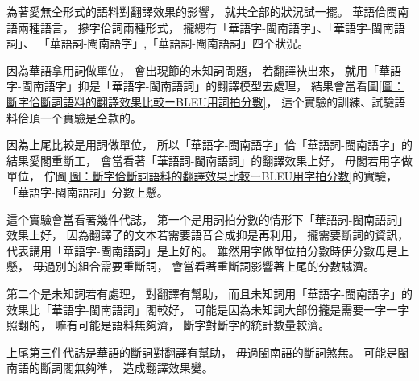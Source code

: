 為著愛無仝形式的語料對翻譯效果的影響，
就共全部的狀況試一擺。
華語佮閩南語兩種語言，
摻字佮詞兩種形式，
攏總有「華語字-閩南語字」、「華語字-閩南語詞」、
「華語詞-閩南語字」,「華語詞-閩南語詞」四个狀況。

因為華語拿用詞做單位，
會出現節的未知詞問題，
若翻譯袂出來，
就用「華語字-閩南語字」抑是「華語字-閩南語詞」的翻譯模型去處理，
結果會當看圖\ref{圖：斷字佮斷詞語料的翻譯效果比較ーBLEU用詞拍分數}，
這个實驗的訓練、試驗語料佮頂一个實驗是仝款的。

因為上尾比較是用詞做單位，
所以「華語字-閩南語字」佮「華語詞-閩南語字」的結果愛閣重斷工，
會當看著「華語詞-閩南語詞」的翻譯效果上好，
毋閣若用字做單位，
佇圖\ref{圖：斷字佮斷詞語料的翻譯效果比較ーBLEU用字拍分數}的實驗，
「華語字-閩南語詞」分數上懸。

這个實驗會當看著幾件代誌，
第一个是用詞拍分數的情形下「華語詞-閩南語詞」效果上好，
因為翻譯了的文本若需要語音合成抑是再利用，
攏需要斷詞的資訊，
代表講用「華語字-閩南語詞」是上好的。
雖然用字做單位拍分數時伊分數毋是上懸，
毋過別的組合需要重斷詞，
會當看著重斷詞影響著上尾的分數誠濟。

第二个是未知詞若有處理，
對翻譯有幫助，
而且未知詞用「華語字-閩南語字」的效果比「華語字-閩南語詞」閣較好，
可能是因為未知詞大部份攏是需要一字一字照翻的，
嘛有可能是語料無夠濟，
斷字對斷字的統計數量較濟。

上尾第三件代誌是華語的斷詞對翻譯有幫助，
毋過閩南語的斷詞煞無。
可能是閩南語的斷詞閣無夠準，
造成翻譯效果變。
